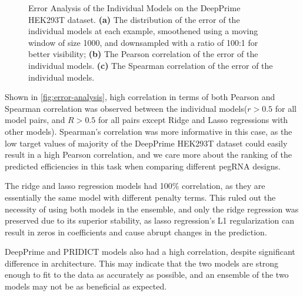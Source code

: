 \begin{figure}
    \centering
    \caption[Error Analysis of the Individual Models]{Error Analysis of the Individual Models on the DeepPrime HEK293T dataset. \textbf{(a)} The distribution of the error of the individual models at each example, smoothened using a moving window of size 1000, and downsampled with a ratio of 100:1 for better visibility; \textbf{(b)} The Pearson correlation of the error of the individual models. \textbf{(c)} The Spearman correlation of the error of the individual models.}
    \label{fig:error-analysis}
\end{figure}

Shown in \autoref{fig:error-analysis}, high correlation in terms of both Pearson and Spearman correlation was observed between the individual models($r>0.5$ for all model pairs, and $R>0.5$ for all pairs except Ridge and Lasso regressions with other models). Spearman's correlation was more informative in this case, as the low target values of majority of the DeepPrime HEK293T dataset could easily result in a high Pearson correlation, and we care more about the ranking of the predicted efficiencies in this task when comparing different pegRNA designs.

The ridge and lasso regression models had 100\% correlation, as they are essentially the same model with different penalty terms. This ruled out the necessity of using both models in the ensemble, and only the ridge regression was preserved due to its superior stability, as lasso regression's L1 regularization can result in zeros in coefficients and cause abrupt changes in the prediction. 

DeepPrime and PRIDICT models also had a high correlation, despite significant difference in architecture. This may indicate that the two models are strong enough to fit to the data as accurately as possible, and an ensemble of the two models may not be as beneficial as expected. 

